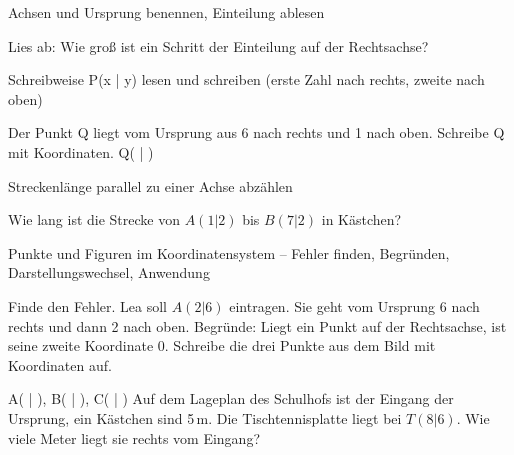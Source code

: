\begin{aufgabe}{Achsen und Ursprung benennen, Einteilung ablesen}
\begin{teile}
\teil Lies ab: Wie groß ist ein Schritt der Einteilung auf der Rechtsachse?

\begin{ksys}[xmin=0,xmax=10,ymin=0,ymax=10,xstep=2,ystep=2] \end{ksys}
\leerfeld
\end{teile}
\end{aufgabe}

\begin{aufgabe}{Schreibweise P(x | y) lesen und schreiben (erste Zahl nach rechts, zweite nach oben)}
\begin{teile}
\teil Der Punkt Q liegt vom Ursprung aus 6 nach rechts und 1 nach oben. Schreibe Q mit Koordinaten. Q( \leerfeld | \leerfeld )
\end{teile}
\end{aufgabe}

\begin{aufgabe}{Streckenlänge parallel zu einer Achse abzählen}
\begin{teile}
\teil Wie lang ist die Strecke von $A(1|2)$ bis $B(7|2)$ in Kästchen? \leerfeld[Kästchen]
\end{teile}
\end{aufgabe}

\begin{aufgabe}{Punkte und Figuren im Koordinatensystem – Fehler finden, Begründen, Darstellungswechsel, Anwendung}
\begin{teile}
\teil Finde den Fehler. Lea soll $A(2|6)$ eintragen. Sie geht vom Ursprung 6 nach rechts und dann 2 nach oben.
\teil Begründe: Liegt ein Punkt auf der Rechtsachse, ist seine zweite Koordinate 0.
\teil Schreibe die drei Punkte aus dem Bild mit Koordinaten auf.

\begin{ksys}[xmin=-3,xmax=7,ymin=-3,ymax=7]    \end{ksys}
A( \leerfeld | \leerfeld ), B( \leerfeld | \leerfeld ), C( \leerfeld | \leerfeld )
\teil Auf dem Lageplan des Schulhofs ist der Eingang der Ursprung, ein Kästchen sind 5\,m. Die Tischtennisplatte liegt bei $T(8|6)$. Wie viele Meter liegt sie rechts vom Eingang? \leerfeld[m]
\end{teile}
\end{aufgabe}
